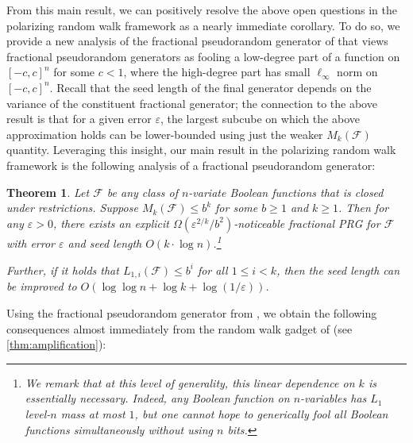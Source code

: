 \documentclass[10pt,a4paper]{article}
\newcommand{\eps}{\varepsilon}
\newtheorem{THM}[theorem]{Theorem}
\theoremstyle{definition}
\begin{document}
{From this main result, we can positively resolve the above open questions in the polarizing random walk framework as a nearly immediate corollary. To do so, we provide a new analysis of the fractional pseudorandom generator of \cite{CHHL} that views fractional pseudorandom generators as fooling a low-degree part of a function on $[-c,c]^n$ for some $c<1$, where the high-degree part has small $\ell_{\infty}$ norm on $[-c,c]^n$. Recall that the seed length of the final generator depends on the variance of the constituent fractional generator; the connection to the above result is that for a given error $\eps$, the largest subcube on which the above approximation holds can be lower-bounded using just the weaker $M_k(\mathcal{F})$ quantity.}
Leveraging this insight, our main result in the polarizing random walk framework is the following analysis of a fractional pseudorandom generator:

\begin{THM}
\label{thm:fracprg1}
Let $\mathcal{F}$ be any class of $n$-variate Boolean functions that is closed under restrictions.  Suppose $M_k(\mathcal{F})\leq b^{k}$ for some $b\geq 1$ and  $k \geq 1$. Then for any $\eps>0$, there exists an explicit $\Omega(\eps^{2/k}/b^2)$-noticeable fractional PRG for $\mathcal{F}$ with error $\eps$ and seed length $O(k\cdot \log n)$.\footnote{We remark that at this level of generality, this linear dependence on $k$ is essentially necessary. Indeed, any Boolean function on $n$-variables has $L_1$ level-$n$ mass at most $1$, but one cannot hope to generically fool all Boolean functions simultaneously without using $n$ bits.}

Further, if it holds that $L_{1,i}(\mathcal{F})\leq b^{i}$ for all $1\leq i<k$, then the seed length can be improved to $O(\log\log n + \log k+\log(1/\eps))$.
\end{THM}


Using the fractional pseudorandom generator from , we obtain the following consequences almost immediately from the random walk gadget of \cite{CHHL} (see \cref{thm:amplification}):
\end{document}
